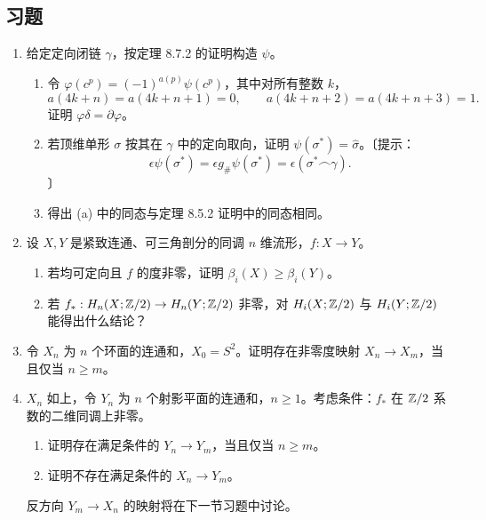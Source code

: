 \subsection*{习题}
\begin{enumerate}
\item 给定定向闭链 $\gamma$，按定理 8.7.2 的证明构造 $\psi$。
\begin{enumerate}[label=(\alph*)]
\item 令 $\varphi(c^p)=(-1)^{a(p)}\psi(c^p)$，其中对所有整数 $k$，
\[a(4k+n)=a(4k+n+1)=0,\qquad a(4k+n+2)=a(4k+n+3)=1.\]
证明 $\varphi\delta=\partial\varphi$。
\item 若顶维单形 $\sigma$ 按其在 $\gamma$ 中的定向取向，证明 $\psi(\sigma^*)=\widehat\sigma$。〔提示：
\[\epsilon\psi(\sigma^*)=\epsilon g_\#\psi(\sigma^*)=\epsilon(\sigma^*\frown\gamma).\]〕
\item 得出 (a) 中的同态与定理 8.5.2 证明中的同态相同。
\end{enumerate}
\item 设 $X,Y$ 是紧致连通、可三角剖分的同调 $n$ 维流形，$f:X\to Y$。
\begin{enumerate}[label=(\alph*)]
\item 若均可定向且 $f$ 的度非零，证明 $\beta_i(X)\ge\beta_i(Y)$。
\item 若 $f_*:H_n(X;\mathbb{Z}/2)\to H_n(Y;\mathbb{Z}/2)$ 非零，对 $H_i(X;\mathbb{Z}/2)$ 与 $H_i(Y;\mathbb{Z}/2)$ 能得出什么结论？
\end{enumerate}
\item 令 $X_n$ 为 $n$ 个环面的连通和，$X_0=S^2$。证明存在非零度映射 $X_n\to X_m$，当且仅当 $n\ge m$。
\item $X_n$ 如上，令 $Y_n$ 为 $n$ 个射影平面的连通和，$n\ge1$。考虑条件：$f_*$ 在 $\mathbb{Z}/2$ 系数的二维同调上非零。
\begin{enumerate}[label=(\alph*)]
\item 证明存在满足条件的 $Y_n\to Y_m$，当且仅当 $n\ge m$。
\item 证明不存在满足条件的 $X_n\to Y_m$。
\end{enumerate}
反方向 $Y_m\to X_n$ 的映射将在下一节习题中讨论。
\end{enumerate}
